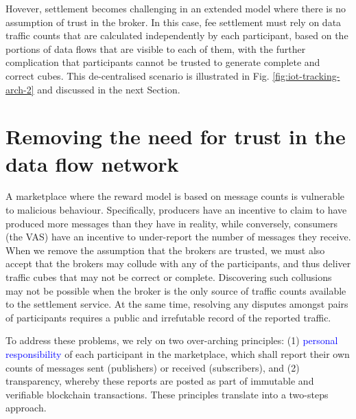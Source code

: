 \documentclass[chi_draft]{sigchi}
\begin{document}
Hovever, settlement becomes challenging in an extended model where there is no assumption of trust in the broker.
In this case, fee settlement must rely on data traffic counts that are calculated independently by each participant, based on the portions of data flows that are visible to each of them, with the 
further complication that participants cannot be trusted to generate complete and correct cubes.
This de-centralised scenario is illustrated in Fig. \ref{fig:iot-tracking-arch-2} and discussed in the next Section.

\section{Removing the need  for trust in the data flow network}  \label{sec:no-trust}

A marketplace where the reward model is based on message counts is vulnerable to malicious behaviour.
Specifically, producers have an incentive to claim to have produced more messages than they have in reality, while conversely, consumers (the VAS) have an incentive to under-report the number of messages they receive.
%
When we remove the assumption that the brokers are trusted, we must also accept that the brokers may collude with any of the participants, and thus deliver traffic cubes that may not be correct or complete.
Discovering such collusions may not be possible when the broker is the only source of traffic counts available to the settlement service.  At the same time, resolving any disputes amongst pairs of participants requires a public and irrefutable record of the reported traffic.

To address these problems, we rely on two over-arching principles: (1) \textcolor{blue}{personal responsibility} 
of each participant in the marketplace, which shall report their own counts of messages sent (publishers) or received (subscribers), 
and (2) transparency, whereby these reports are posted as part of immutable and verifiable blockchain transactions.
These principles translate into a two-steps approach.
%
\end{document}
